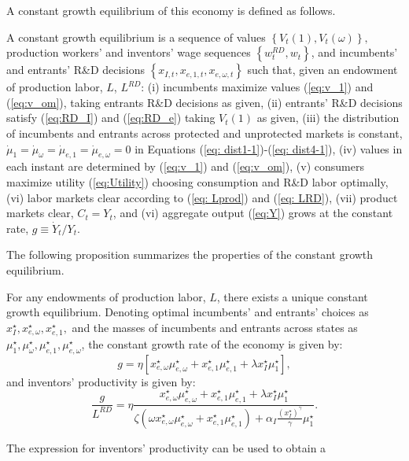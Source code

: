 A constant growth equilibrium of this economy is defined as follows.
\begin{defn}
 A constant growth equilibrium is a sequence of values $\left\{ V_{t}(1),V_{t}(\omega)\right\} ,$
production workers' and inventors' wage sequences $\left\{ w_{t}^{RD},w_{t}\right\} $,
and incumbents' and entrants' R\&D decisions $\left\{ x_{I,t},x_{e,1,t},x_{e,\omega,t}\right\} $
such that, given an endowment of production labor, $L$, $L^{RD}$:
(i) incumbents maximize values (\ref{eq:v_1}) and (\ref{eq:v_om}),
taking entrants R\&D decisions as given, (ii) entrants' R\&D decisions
satisfy (\ref{eq:RD_I}) and (\ref{eq:RD_e}) taking $V_{t}(1)$ as
given, (iii) the distribution of incumbents and entrants across protected
and unprotected markets is constant, $\dot{\mu}_{1}=\dot{\mu}_{\omega}=\dot{\mu}_{e,1}=\dot{\mu}_{e,\omega}=0$
in Equations (\ref{eq: dist1-1})-(\ref{eq: dist4-1}), (iv) values
in each instant are determined by (\ref{eq:v_1}) and (\ref{eq:v_om}),
(v) consumers maximize utility (\ref{eq:Utility}) choosing consumption
and R\&D labor optimally, (vi) labor markets clear according to (\ref{eq: Lprod})
and (\ref{eq: LRD}), (vii) product markets clear, $C_{t}=Y_{t}$,
and (vi) aggregate output (\ref{eq:Y}) grows at the constant rate,
$g\equiv\dot{Y}_{t}/Y_{t}.$
\end{defn}
The following proposition summarizes the properties of the constant
growth equilibrium.
\begin{prop}
 \label{prop:CGE}For any endowments of production labor, $L$, there
exists a unique constant growth equilibrium. Denoting optimal incumbents'
and entrants' choices as $x_{I}^{\star},x_{e,\omega}^{\star},x_{e,1}^{\star},$
and the masses of incumbents and entrants across states as $\mu_{1}^{\star},\mu_{\omega}^{\star},\mu_{e,1}^{\star},\mu_{e,\omega}^{\star}$,
the constant growth rate of the economy is given by:
\[
g=\eta\left[x_{e,\omega}^{\star}\mu_{e,\omega}^{\star}+x_{e,1}^{\star}\mu_{e,1}^{\star}+\lambda x_{I}^{\star}\mu_{1}^{\star}\right],
\]
and inventors' productivity is given by:
\[
\frac{g}{L^{RD}}=\eta\frac{x_{e,\omega}^{\star}\mu_{e,\omega}^{\star}+x_{e,1}^{\star}\mu_{e,1}^{\star}+\lambda x_{I}^{\star}\mu_{1}^{\star}}{\zeta\left(\omega x_{e,\omega}^{\star}\mu_{e,\omega}^{\star}+x_{e,1}^{\star}\mu_{e,1}^{\star}\right)+\alpha_{I}\frac{\left(x_{I}^{\star}\right)^{\gamma}}{\gamma}\mu_{1}^{\star}}.
\]
\end{prop}
%
The expression for inventors' productivity can be used to obtain a
